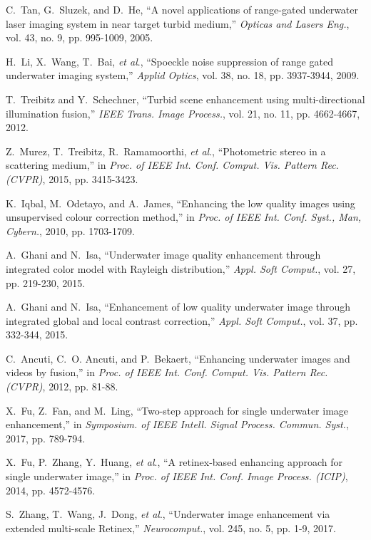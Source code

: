 \documentclass[journal]{IEEEtran}
\newcommand{\etal}{\textit{et al}.}
\begin{document}
\begin{thebibliography}{20}
C.~Tan, G.~Sluzek, and D.~He, ``A novel applications of range-gated underwater laser imaging system in near target turbid medium,'' \emph{Opticas and Lasers Eng.}, vol. 43, no. 9, pp. 995-1009, 2005.

H.~Li, X.~Wang, T.~Bai, \etal, ``Spoeckle noise suppression of range gated underwater imaging system,'' \emph{Applid Optics}, vol. 38, no. 18, pp. 3937-3944, 2009.

T.~Treibitz and Y.~Schechner, ``Turbid scene enhancement using multi-directional illumination fusion,'' \emph{IEEE Trans. Image Process.}, vol. 21, no. 11, pp. 4662-4667, 2012.

Z.~Murez, T.~Treibitz, R.~Ramamoorthi, \etal, ``Photometric stereo in a scattering medium,'' in \emph{Proc. of IEEE Int. Conf. Comput. Vis. Pattern Rec. (CVPR)}, 2015, pp. 3415-3423.

K.~Iqbal, M.~Odetayo, and A.~James, ``Enhancing the low quality images using unsupervised colour correction method,'' in \emph{Proc. of IEEE Int. Conf. Syst., Man, Cybern.}, 2010, pp. 1703-1709.

A.~Ghani and N.~Isa, ``Underwater image quality enhancement through integrated color model with Rayleigh distribution,'' \emph{Appl. Soft Comput.}, vol. 27, pp. 219-230, 2015.

A.~Ghani and N.~Isa, ``Enhancement of low quality underwater image through integrated global and local contrast correction,'' \emph{Appl. Soft Comput.}, vol. 37, pp. 332-344, 2015.

C.~Ancuti, C.~O. Ancuti, and P.~Bekaert, ``Enhancing underwater images and videos by fusion,'' in \emph{Proc. of IEEE Int. Conf. Comput. Vis. Pattern Rec. (CVPR)}, 2012, pp. 81-88.


X.~Fu, Z.~Fan, and M.~Ling, ``Two-step approach for single underwater image enhancement,'' in \emph{Symposium. of IEEE Intell. Signal Process. Commun. Syst.}, 2017, pp. 789-794.

X.~Fu, P.~Zhang, Y.~Huang, \etal, ``A retinex-based enhancing approach for single underwater image,'' in \emph{Proc. of IEEE Int. Conf. Image Process. (ICIP)}, 2014, pp. 4572-4576.

S.~Zhang, T.~Wang, J.~Dong, \etal, ``Underwater image enhancement via extended multi-scale Retinex,'' \emph{Neurocomput.}, vol. 245, no. 5, pp. 1-9, 2017.


\end{thebibliography}
\end{document}
